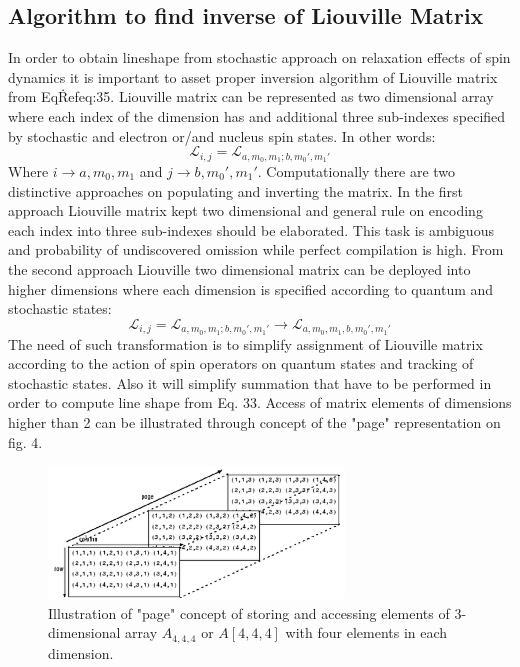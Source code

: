 \subsection{Algorithm to find inverse of Liouville Matrix}\label{algorithmsection}
In order to obtain lineshape from stochastic approach on relaxation effects of spin dynamics it is important to asset proper inversion algorithm of Liouville matrix from Eq\.Ref{eq:35}. Liouville matrix can be represented as two dimensional array where each index of the dimension has and additional three sub-indexes specified by stochastic and electron or/and nucleus spin states. In other words: 
\begin{equation}\label{eq:53}
\mathcal{L}_{i,j}=\mathcal{L}_{a,m_0,m_1;b,m_0',m_1'}  
\end{equation}  
Where $i\rightarrow a,m_0,m_1$ and $j\rightarrow b,m_0',m_1'$. Computationally there are two distinctive approaches on populating and inverting the matrix. In the first approach Liouville matrix kept two dimensional and general rule on encoding each index into three sub-indexes should be elaborated. This task is ambiguous and probability of undiscovered omission while perfect compilation is high. From the second approach Liouville two dimensional matrix can be deployed into higher dimensions where each dimension is specified according to quantum and stochastic states:  
\begin{equation}\label{eq:54}
\mathcal{L}_{i,j}=\mathcal{L}_{a,m_0,m_1;b,m_0',m_1'}\rightarrow \mathcal{L}_{a,m_0,m_1,b,m_0',m_1'}
\end{equation}
The need of such transformation is to simplify assignment of Liouville matrix according to the action of spin operators on quantum states and tracking of stochastic states. Also it will simplify summation that have to be performed in order to compute line shape from Eq. 33. Access of matrix elements of dimensions higher than 2 can be illustrated through concept of the "page" representation on fig. 4. 
\begin{figure}[h!]
\centering
\includegraphics[width=0.7\textwidth]{figures/chap1/mat.png}
\caption{Illustration of "page" concept of storing and accessing elements of 3-dimensional array $A_{4,4,4}$ or $A[4,4,4]$ with four elements in each dimension.~\cite{Matlab}}
\end{figure}
